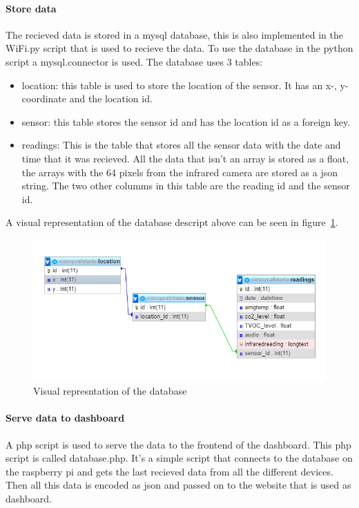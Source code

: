 \documentclass[11pt,a4paper]{article}
\begin{document}
\paragraph{Store data}
The recieved data is stored in a mysql database, this is also implemented in the WiFi.py script that is used to recieve the data.
To use the database in the python script a mysql.connector is used.
The database uses 3 tables: 
\begin{itemize}
	\item location: this table is used to store the location of the sensor. It has an x-, y-coordinate and the location id.
	\item sensor: this table stores the sensor id  and has the location id as a foreign key.
	\item readings: This is the table that stores all the sensor data with the date and time that it was recieved. 
					All the data that isn't an array is stored as a float, the arrays with the 64 pixels from the infrared camera are stored as a json string.
					The two other columms in this table are the reading id and the sensor id.  
\end{itemize}
A visual representation of the database descript above can be seen in figure~\ref{fig:db_des}.

\begin{figure}[H]
	\centering
	\includegraphics[width=1.0\linewidth]{databaseDesign.png}
	\caption{Visual represntation of the database}
	\label{fig:db_des}
\end{figure}

\paragraph{Serve data to dashboard}
A php script is used to serve the data to the frontend of the dashboard. This php script is called database.php. 
It's a simple script that connects to the database on the raspberry pi and gets the last recieved data from all the different devices.
Then all this data is encoded as json and passed on to the website that is used as dashboard. 
\end{document}
